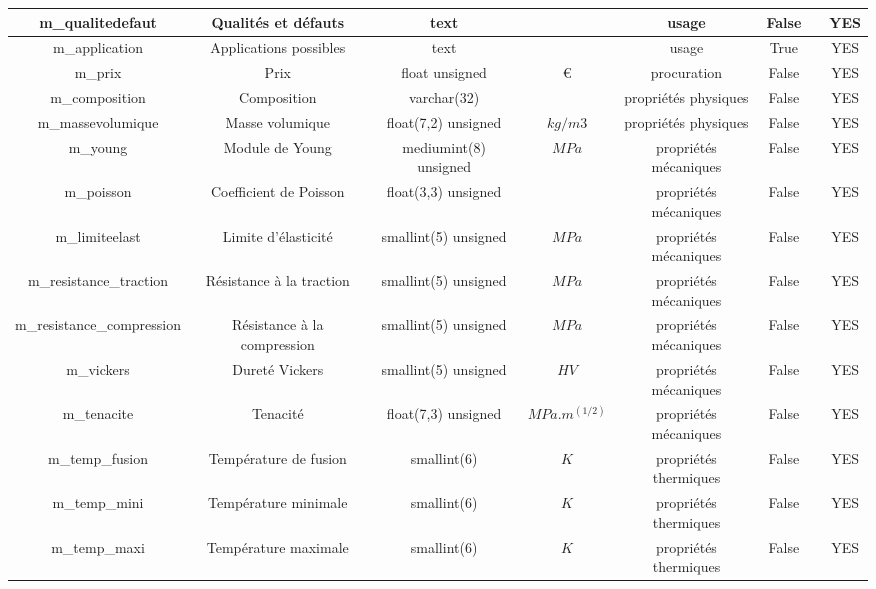 \documentclass[12pt,a4paper]{article}
\begin{document}
\begin{table}
\begin{center}
\begin{tabular}{|c|c|c|c|c|c|c|c|}
                \hline
                m\_qualitedefaut & Qualités et défauts & text & $ $ & usage & False &  & YES \\
                \hline
                m\_application & Applications possibles & text & $ $ & usage & True &  & YES \\
                \hline
                m\_prix & Prix & float unsigned & $€$ & procuration & False &  & YES \\
                \hline
                m\_composition & Composition & varchar(32) & $ $ & propriétés physiques & False &  & YES \\
                \hline
                m\_massevolumique & Masse volumique & float(7,2) unsigned & $kg/m3$ & propriétés physiques & False &  & YES \\
                \hline
                m\_young & Module de Young & mediumint(8) unsigned & $MPa$ & propriétés mécaniques & False &  & YES \\
                \hline
                m\_poisson & Coefficient de Poisson & float(3,3) unsigned & $ $ & propriétés mécaniques & False &  & YES \\
                \hline
                m\_limiteelast & Limite d'élasticité & smallint(5) unsigned & $MPa$ & propriétés mécaniques & False &  & YES \\
                \hline
                m\_resistance\_traction & Résistance à la traction & smallint(5) unsigned & $MPa$ & propriétés mécaniques & False &  & YES \\
                \hline
                m\_resistance\_compression & Résistance à la compression & smallint(5) unsigned & $MPa$ & propriétés mécaniques & False &  & YES \\
                \hline
                m\_vickers & Dureté Vickers & smallint(5) unsigned & $HV$ & propriétés mécaniques & False &  & YES \\
                \hline
                m\_tenacite & Tenacité & float(7,3) unsigned & $MPa.m^(1/2)$ & propriétés mécaniques & False &  & YES \\
                \hline
                m\_temp\_fusion & Température de fusion & smallint(6) & $K$ & propriétés thermiques & False &  & YES \\
                \hline
                m\_temp\_mini & Température minimale & smallint(6) & $K$ & propriétés thermiques & False &  & YES \\
                \hline
                m\_temp\_maxi & Température maximale & smallint(6) & $K$ & propriétés thermiques & False &  & YES \\

\end{tabular}
\end{center}
\end{table}
\end{document}
